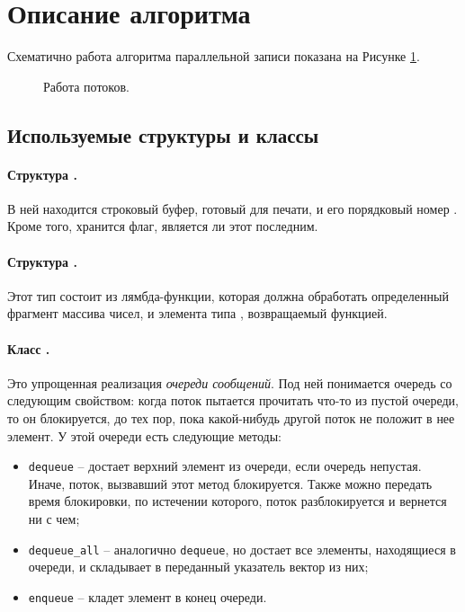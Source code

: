 \section{Описание алгоритма} \label{sec1}
Схематично работа алгоритма параллельной записи показана на Рисунке \ref{draw}.
\begin{figure}[h!]
\begin{footnotesize}
\def\svgwidth{430pt}
  
  \caption{Работа потоков.} \label{draw}
\end{footnotesize}\end{figure}

\subsection{Используемые структуры и классы}
\paragraph{Структура \texttt{}.}
В ней находится строковый буфер, готовый для печати, и его порядковый номер \texttt{}.
Кроме того, хранится флаг, является ли этот \texttt{} последним.
\paragraph{Структура \texttt{}.}
Этот тип состоит из лямбда-функции, которая должна обработать определенный фрагмент массива чисел, и элемента типа \texttt{}, возвращаемый функцией.
\paragraph{Класс \texttt{}.}
Это упрощенная реализация \textit{очереди сообщений}.  
Под ней понимается очередь со следующим свойством: когда поток пытается прочитать что-то из пустой очереди, то он блокируется, до тех пор, пока какой-нибудь другой поток не положит в нее элемент.
У этой очереди есть следующие методы:
\begin{itemize}
\item \texttt{dequeue} -- достает верхний элемент из очереди, если очередь непустая.
Иначе, поток, вызвавший этот метод блокируется. Также можно передать время блокировки, по истечении которого, поток разблокируется и вернется ни с чем;
\item \texttt{dequeue\_all} -- аналогично \texttt{dequeue}, но достает все элементы, находящиеся в очереди, и складывает в переданный указатель вектор из них;
\item \texttt{enqueue} -- кладет элемент в конец очереди.
\end{itemize}
